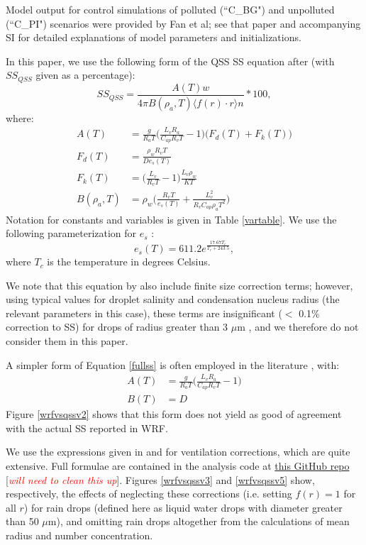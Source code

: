 \documentclass{article}
\newcommand{\klcomm}[1]{\textcolor{red}{\textit{#1}}}
\begin{document}
Model output for control simulations of polluted (``C\_BG") and unpolluted (``C\_PI") scenarios were provided by Fan et al; see that paper and accompanying SI for detailed explanations of model parameters and initializations.

In this paper, we use the following form of the QSS SS equation after \cite{Rogers1989} (with $SS_{QSS}$ given as a percentage):
\begin{equation}
\label{fullss}
SS_{QSS} = \frac{A(T) w}{4\pi B(\rho_a, T) \langle f(r)\cdot r\rangle n}*100,
\end{equation}
where:
\begin{align}
A(T) &= \frac{g}{R_a T}\Big(\frac{L_v R_a}{C_{ap} R_v T} - 1\Big)\big(F_d(T) + F_k(T)\big)\nonumber\\
F_d(T) &= \frac{\rho_w R_v T}{D e_s(T)}\nonumber\\
F_k(T) &= \Big(\frac{L_v}{R_v T} - 1\Big)\frac{L_v \rho_w}{K T}\nonumber\\
B(\rho_a, T) &= \rho_w\Big(\frac{R_v T}{e_s(T)} + \frac{L_v^2}{R_v C_{ap} \rho_a T^2}\Big)
\end{align}
Notation for constants and variables is given in Table \ref{vartable}. We use the following parameterization for $e_s$ \cite{Rogers1989}:
\begin{equation}
e_s(T) = 611.2e^{\frac{17.67T_c}{T_c + 243.5}},
\end{equation}
where $T_c$ is the temperature in degrees Celsius.

We note that this equation by also include finite size correction terms; however, using typical values for droplet salinity and condensation nucleus radius (the relevant parameters in this case), these terms are insignificant ($<$ 0.1\% correction to SS) for drops of radius greater than 3 $\mu$m \cite{Rogers1989}, and we therefore do not consider them in this paper.

A simpler form of Equation \ref{fullss} is often employed in the literature \cite{Grabowski2020, Rogers1989}, with:
\begin{align}
A(T) &= \frac{g}{R_a T}\Big(\frac{L_v R_a}{C_{ap} R_v T} - 1\Big)\nonumber\\
B(T) &= D
\end{align}
Figure \ref{wrfvsqssv2} shows that this form does not yield as good of agreement with the actual SS reported in WRF.

We use the expressions given in \cite{Pruppacher2010} and \cite{Rogers1989} for ventilation corrections, which are quite extensive. Full formulae are contained in the analysis code at \href{https://github.com/kt-latimer/20supersat}{this GitHub repo} [\klcomm{will need to clean this up}]. Figures \ref{wrfvsqssv3} and \ref{wrfvsqssv5} show, respectively, the effects of neglecting these corrections (i.e. setting $f(r)=1$ for all $r$) for rain drops (defined here as liquid water drops with diameter greater than 50 $\mu$m), and omitting rain drops altogether from the calculations of mean radius and number concentration.
\end{document}
